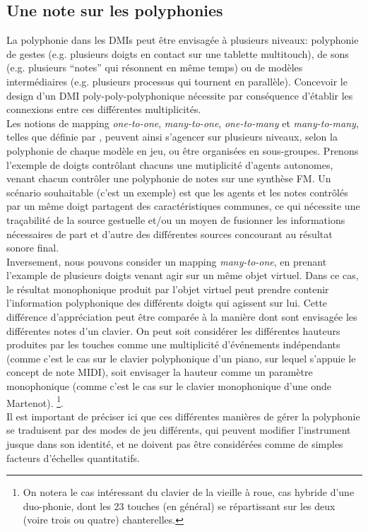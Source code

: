 \subsection{Une note sur les polyphonies}

\noindent La polyphonie dans les \glspl{DMI} peut être envisagée à plusieurs niveaux: polyphonie de gestes (e.g. plusieurs doigts en contact sur une tablette multitouch), de sons (e.g. plusieurs ``notes'' qui résonnent en même temps) ou de modèles intermédiaires (e.g. plusieurs processus qui tournent en parallèle). Concevoir le design d'un \gls{DMI} poly-poly-polyphonique nécessite par conséquence d'établir les connexions entre ces différentes multiplicités.\\
\indent Les notions de mapping \textit{one-to-one}, \textit{many-to-one}, \textit{one-to-many} et \textit{many-to-many}, telles que définie par \cite{todo_Wanderley}, peuvent ainsi s'agencer sur plusieurs niveaux, selon la polyphonie de chaque modèle en jeu, ou être organisées en sous-groupes. Prenons l'exemple de doigts contrôlant chacuns une mutiplicité d'agents autonomes, venant chacun contrôler une polyphonie de notes sur une synthèse \gls{FM}. Un scénario souhaitable (c'est un exemple) est que les agents et les notes contrôlés par un même doigt partagent des caractéristiques communes, ce qui nécessite une traçabilité de la source gestuelle et/ou un moyen de fusionner les informations nécessaires de part et d'autre des différentes sources concourant au résultat sonore final.\\
\indent Inversement, nous pouvons consider un mapping \textit{many-to-one}, en prenant l'example de plusieurs doigts venant agir sur un même objet virtuel. Dans ce cas, le résultat monophonique produit par l'objet virtuel peut prendre contenir l'information polyphonique des différents doigts qui agissent sur lui. Cette différence d'appréciation peut être comparée à la manière dont sont envisagée les différentes notes d'un clavier. On peut soit considérer les différentes hauteurs produites par les touches comme une multiplicité d'événements indépendants (comme c'est le cas sur le clavier polyphonique d'un piano, sur lequel s'appuie le concept de note \gls{MIDI}), soit envisager la hauteur comme un paramètre monophonique (comme c'est le cas sur le clavier monophonique d'une onde Martenot). \footnote{On notera le cas intéressant du clavier de la vieille à roue, cas hybride d'une duo-phonie, dont les 23 touches (en général) se répartissant sur les deux (voire trois ou quatre) chanterelles.}.\\
\indent Il est important de préciser ici que ces différentes manières de gérer la polyphonie se traduisent par des modes de jeu différents, qui peuvent modifier l'instrument jusque dans son identité, et ne doivent pas être considérées comme de simples facteurs d'échelles quantitatifs.

